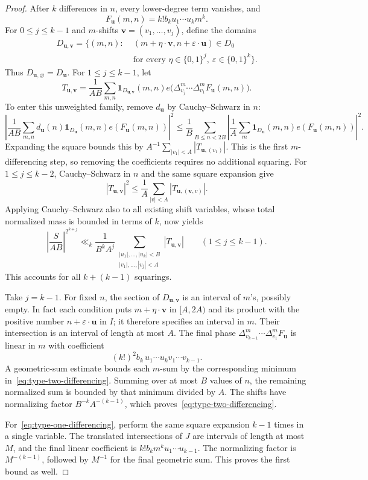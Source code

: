 \begin{proof}
After $k$ differences in $n$, every lower-degree term vanishes, and
\[
 F_{\mathbf u}(m,n)=k!b_k u_1\cdots u_k m^k.
\]
For $0\le j\le k-1$ and $m$-shifts
$\mathbf v=(v_1,\ldots,v_j)$, define the domains
\[
 \begin{split}
 D_{\mathbf u,\mathbf v}=\{(m,n):\;&
 (m+\eta\cdot\mathbf v,n+\varepsilon\cdot\mathbf u)\in D_0\\
 &\text{for every }\eta\in\{0,1\}^j,
                         \ \varepsilon\in\{0,1\}^k\}.
 \end{split}
\]
Thus $D_{\mathbf u,\varnothing}=D_{\mathbf u}$.  For $1\le j\le k-1$, let
\[
 T_{\mathbf u,\mathbf v}
 =\frac1{AB}\sum_{m,n}\mathbf 1_{D_{\mathbf u,\mathbf v}}(m,n)
 e\bigl(\Delta^m_{v_j}\cdots\Delta^m_{v_1}F_{\mathbf u}(m,n)\bigr).
\]
To enter this unweighted family, remove $d_{\mathbf u}$ by
Cauchy--Schwarz in $n$:
\[
 \left|\frac1{AB}\sum_{m,n}
 d_{\mathbf u}(n)\mathbf 1_{D_{\mathbf u}}(m,n)e(F_{\mathbf u}(m,n))
 \right|^2
 \le\frac1B\sum_{B\le n<2B}
 \left|\frac1A\sum_m
    \mathbf 1_{D_{\mathbf u}}(m,n)e(F_{\mathbf u}(m,n))\right|^2.
\]
Expanding the square bounds this by
$A^{-1}\sum_{|v_1|<A}|T_{\mathbf u,(v_1)}|$.
This is the first $m$-differencing step, so removing the coefficients
requires no additional squaring.  For $1\le j\le k-2$, Cauchy--Schwarz
in $n$ and the same square expansion give
\[
 |T_{\mathbf u,\mathbf v}|^2
 \le\frac1A\sum_{|v|<A}|T_{\mathbf u,(\mathbf v,v)}|.
\]
Applying Cauchy--Schwarz also to all existing shift variables, whose
total normalized mass is bounded in terms of $k$, now yields
\begin{equation}\label{eq:m-difference-stage}
 \left|\frac{S}{AB}\right|^{2^{k+j}}
 \ll_k\frac1{B^kA^j}
 \sum_{\substack{|u_1|,\ldots,|u_k|<B\\|v_1|,\ldots,|v_j|<A}}
          |T_{\mathbf u,\mathbf v}|\qquad(1\le j\le k-1).
\end{equation}
This accounts for all $k+(k-1)$ squarings.

Take $j=k-1$.  For fixed $n$, the section of $D_{\mathbf u,\mathbf v}$
is an interval of $m$'s, possibly empty.  In fact each
condition puts $m+\eta\cdot\mathbf v$ in $[A,2A)$ and its product with
the positive number $n+\varepsilon\cdot\mathbf u$ in $I$; it therefore
specifies an interval in $m$.  Their intersection is an interval of
length at most $A$.  The final phase
$\Delta^m_{v_{k-1}}\cdots\Delta^m_{v_1}F_{\mathbf u}$ is linear in $m$
with coefficient
\[
 (k!)^2b_k\,u_1\cdots u_kv_1\cdots v_{k-1}.
\]
A geometric-sum estimate bounds each $m$-sum by the corresponding
minimum in~\eqref{eq:type-two-differencing}.  Summing over at most $B$
values of $n$, the remaining normalized sum is bounded by that minimum
divided by $A$.  The shifts have normalizing factor
$B^{-k}A^{-(k-1)}$, which proves~\eqref{eq:type-two-differencing}.

For~\eqref{eq:type-one-differencing}, perform the same square expansion
$k-1$ times in a single variable.  The translated intersections of $J$
are intervals of length at most $M$, and the final linear coefficient
is $k!b_km^ku_1\cdots u_{k-1}$.  The normalizing factor is
$M^{-(k-1)}$, followed by $M^{-1}$ for the final geometric sum.
This proves the first bound as well.
\end{proof}

